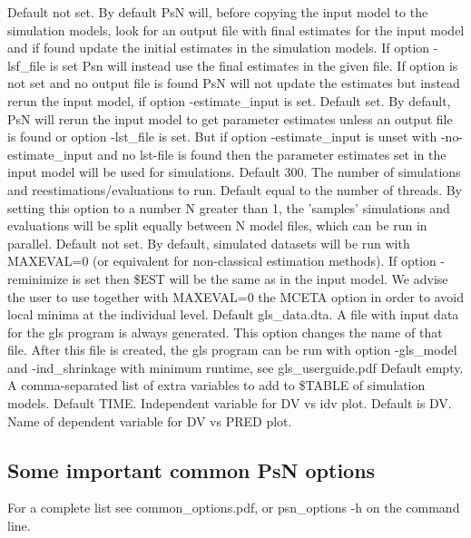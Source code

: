 \begin{optionlist}
Default not set. By default PsN will, before copying the input model to the simulation models, look for an output file with final estimates for the input model and if found update the initial estimates in the simulation models. If option -lsf\_file is set Psn will instead use the final estimates in the given file. If option is not set and no output file is found PsN will not update the estimates but instead rerun the input model, if option -estimate\_input is set. 
\nextopt
{}
Default set. By default, PsN will rerun the input model to get parameter estimates unless an output file is found or option -lst\_file is set. But if option -estimate\_input is unset with -no-estimate\_input and no lst-file is found then the parameter estimates set in the input model will be used for simulations. 
\nextopt
{}
Default 300. The number of simulations and reestimations/evaluations to run. 
\nextopt
{}
Default equal to the number of threads.
By setting this option to a number N greater than 1, the 'samples' simulations and evaluations
will be split equally between N model files, which can be run in parallel.
\nextopt
{}
Default not set. By default, simulated datasets will be run with MAXEVAL=0 (or equivalent for non-classical estimation methods). If option -reminimize is set then \$EST will be the same as in the input model. We advise the user to use together with MAXEVAL=0 the MCETA option in order to avoid local minima at the individual level.
\nextopt
{}
Default gls\_data.dta. A file with input data for the gls program is always generated. This option changes the name of that file. After this file is created, the gls program can be run with option \mbox{-gls\_model} and -ind\_shrinkage with minimum runtime, see gls\_userguide.pdf 
\nextopt
{}
Default empty. A comma-separated list of extra variables to add to \$TABLE of simulation models.
\nextopt
{}
Default TIME. Independent variable for DV vs idv plot.
\nextopt
{}
Default is DV. Name of dependent variable for DV vs PRED plot.
\nextopt
\end{optionlist}

\subsection{Some important common PsN options}
For a complete list see common\_options.pdf, 
or psn\_options -h on the command line.



